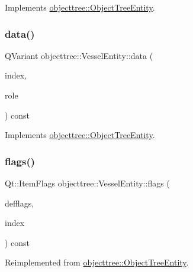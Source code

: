 Implements \mbox{\hyperlink{classobjecttree_1_1_object_tree_entity_a70fd25eccf88b305e9db15fbe3daeae8}{objecttree\+::\+Object\+Tree\+Entity}}.

\mbox{\label{classobjecttree_1_1_vessel_entity_afce0ec4f7419907bac636bdcdc531832}} 
\subsubsection{\texorpdfstring{data()}{data()}}
{\footnotesize\ttfamily Q\+Variant objecttree\+::\+Vessel\+Entity\+::data (\begin{DoxyParamCaption}\item[{const Q\+Model\+Index \&}]{index,  }\item[{int}]{role }\end{DoxyParamCaption}) const\hspace{0.3cm}{\ttfamily [virtual]}}



Implements \mbox{\hyperlink{classobjecttree_1_1_object_tree_entity_a2413c6573de18b451d97eb3800f10f35}{objecttree\+::\+Object\+Tree\+Entity}}.

\mbox{\label{classobjecttree_1_1_vessel_entity_a9998a9efc49fd3e195bf8cd9c5936118}} 
\subsubsection{\texorpdfstring{flags()}{flags()}}
{\footnotesize\ttfamily Qt\+::\+Item\+Flags objecttree\+::\+Vessel\+Entity\+::flags (\begin{DoxyParamCaption}\item[{Qt\+::\+Item\+Flags}]{defflags,  }\item[{const Q\+Model\+Index \&}]{index }\end{DoxyParamCaption}) const\hspace{0.3cm}{\ttfamily [virtual]}}



Reimplemented from \mbox{\hyperlink{classobjecttree_1_1_object_tree_entity_a71042bfb5a8328bcbde9d283c0b1b28c}{objecttree\+::\+Object\+Tree\+Entity}}.


